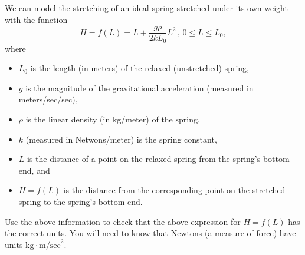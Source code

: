 \documentclass{ximera}
\begin{document}
We can model the stretching of an ideal spring stretched under its own weight with the function
\[
 H = f(L) = L + \frac{g\rho}{2kL_0}L^2 \, , \, 0\leq L \leq L_0 ,
\]
where
\begin{itemize}
\item $L_0$ is the length (in meters) of the relaxed (unstretched) spring, 

\item $g$ is the magnitude of the gravitational acceleration (measured in meters/sec/sec),

\item $\rho$ is the linear density (in kg/meter) of the spring,

\item $k$ (measured in Netwons/meter) is the spring constant,

\item $L$ is the distance of a point on the relaxed spring from the spring's bottom end, and

\item $H=f(L)$ is the distance from the corresponding point on the stretched spring to the spring's bottom end.

\end{itemize}

\begin{freeResponse}
Use the above information to check that the above expression for $H=f(L)$ has the correct units. You will need to know that Newtons (a measure of force) have units $\text{kg}\cdot \text{m/sec}^2$. 
\end{freeResponse}
\end{document}

